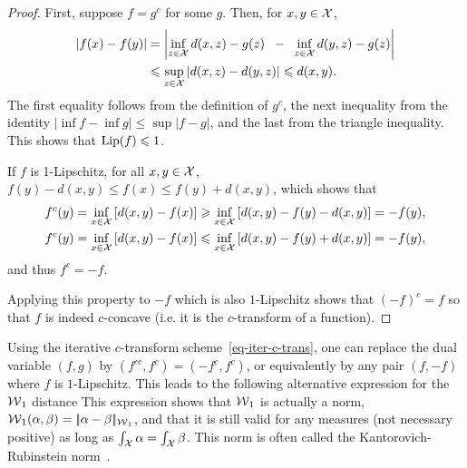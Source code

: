 \begin{proof}
First, suppose $f=g^c$ for some $g$.  Then, for $x,y\in \mathcal{X}$,
\begin{align*}
|f(x)-f(y)|&=\left|\inf_{z\in\mathcal{X}} d(x,z)-g(z) \;\; - \;\;\inf_{z\in \mathcal{X}} d(y,z)-g(z) \right|\\
&\leqslant \sup_{z\in\mathcal{X}} |d(x,z)-d(y,z)|\leqslant d(x,y).
\end{align*}
The first equality follows from the definition of $g^c$, the next inequality from the identity $|\inf f-\inf g|\leq\sup|f-g|$, and the last from the triangle inequality. This shows that $\operatorname{Lip}(f)\leqslant1$.

If $f$ is 1-Lipschitz, for all $x,y\in\mathcal{X}$, $f(y)-d(x,y)\leq f(x)\leq f(y)+d(x,y)$, which shows that 
\begin{align*}
f^c(y)&=\inf_{x\in\mathcal{X}}\left[ d(x,y) - f(x) \right]
\geqslant\inf_{x\in \mathcal{X}} \left[  d(x,y)-f(y)-d(x,y)\right]=-f(y),\\
f^c(y)&=\inf_{x\in\mathcal{X}}\left[ d(x,y) - f(x) \right]
\leqslant \inf_{x\in\mathcal{X}}\left[ d(x,y) - f(y)+d(x,y) \right]=-f(y), 
\end{align*}
and thus $f^c=-f$. 

Applying this property to $-f$ which is also $1$-Lipschitz shows that $(-f)^c = f$ so that $f$ is indeed $c$-concave (i.e. it is the $c$-transform of a function). 
\end{proof}

Using the iterative $c$-transform scheme~\eqref{eq-iter-c-trans}, one can replace the dual variable $(f,g)$ by $(f^{cc},f^{c})=(-f^c,f^{c})$, or equivalently by any pair $(f,-f)$ where $f$ is $1$-Lipschitz. 
%
This leads to the following alternative expression for the $\operatorname{\mathcal{W}}_1$ distance
This expression shows that $\operatorname{\mathcal{W}}_1$ is actually a norm, \ie $\operatorname{\mathcal{W}}_1(\alpha,\beta) = |\!| \alpha-\beta |\!|_{\operatorname{\mathcal{W}}_1}$, and that it is still valid for any measures (not necessary positive) as long as $\int_{\mathcal{X}} \alpha=\int_{\mathcal{X}} \beta$. This norm is often called the Kantorovich-Rubinstein norm~\cite{kantorovich1958space}.

